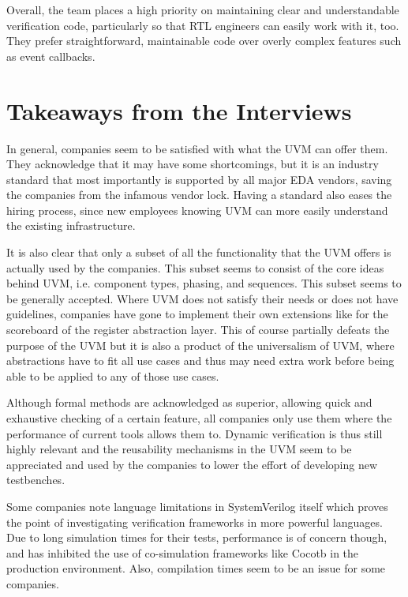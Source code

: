 Overall, the team places a high priority on maintaining clear and understandable verification code, particularly so
that RTL engineers can easily work with it, too. They prefer straightforward, maintainable code over overly complex
features such as event callbacks.

\section{Takeaways from the Interviews} %


In general, companies seem to be satisfied with what the UVM can offer them. They acknowledge that it may have some
shortcomings, but it is an industry standard that most importantly is supported by all major EDA vendors, saving the
companies from the infamous vendor lock. Having a standard also eases the hiring process, since new employees knowing
UVM can more easily understand the existing infrastructure.

It is also clear that only a subset of all the functionality that the UVM offers is actually used by the companies. This
subset seems to consist of the core ideas behind UVM, i.e. component types, phasing, and sequences. This subset seems to be generally accepted. Where UVM does not satisfy their needs or does not have guidelines, companies have gone to implement their own extensions like for the scoreboard of the register abstraction layer. This of course partially defeats the purpose of the UVM but it is also a product of the universalism of
UVM, where abstractions have to fit all use cases and thus may need extra work before being able to be applied to any
of those use cases.

Although formal methods are acknowledged as superior, allowing quick and exhaustive checking of a certain feature,
all companies only use them where the performance of current tools allows them to. Dynamic verification is thus still
highly relevant and the reusability mechanisms in the UVM seem to be appreciated and used by the companies to lower
the effort of developing new testbenches.

Some companies note language limitations in SystemVerilog itself which proves the point of investigating
verification frameworks in more powerful languages. Due to long simulation times for their tests, performance is of
concern though, and has inhibited the use of co-simulation frameworks like Cocotb in the production environment. Also,
compilation times seem to be an issue for some companies.

